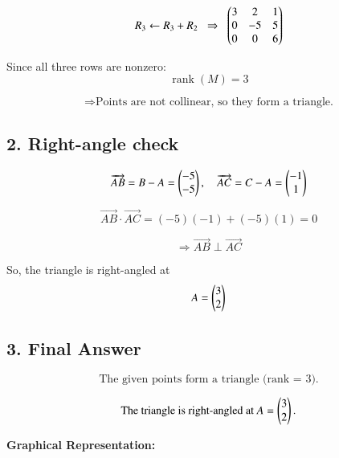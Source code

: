 \documentclass[journal]{IEEEtran}
\begin{document}
\begin{equation}
R_3 \leftarrow R_3+R_2
\;\;\Rightarrow\;\;
\begin{pmatrix}
3 & 2 & 1\\
0 & -5 & 5\\
0 & 0 & 6
\end{pmatrix}
\end{equation}

Since all three rows are nonzero:
\begin{equation}
\operatorname{rank}(M)=3
\end{equation}

\[
\Rightarrow \text{Points are not collinear, so they form a triangle.}
\]

\subsection*{2. Right-angle check}

\begin{equation}
\overrightarrow{AB}=B-A=\begin{pmatrix}-5\\-5\end{pmatrix}, \quad 
\overrightarrow{AC}=C-A=\begin{pmatrix}-1\\1\end{pmatrix}
\end{equation}

\begin{equation}
\overrightarrow{AB}\cdot \overrightarrow{AC} = (-5)(-1)+(-5)(1)=0
\end{equation}

\[
\Rightarrow \overrightarrow{AB}\perp \overrightarrow{AC}
\]

So, the triangle is right-angled at
\begin{equation}
A=\begin{pmatrix}3\\2\end{pmatrix}
\end{equation}

\subsection*{3. Final Answer}

\begin{equation}
\text{The given points form a triangle (rank = 3).}
\end{equation}

\begin{equation}
\text{The triangle is right-angled at } A=\begin{pmatrix}3\\2\end{pmatrix}.
\end{equation}

\textbf{Graphical Representation:}
\end{document}
